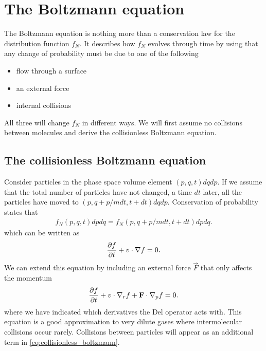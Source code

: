 \section{The Boltzmann equation}
The Boltzmann equation is nothing more than a conservation law for the distribution function $f_N$. It describes how $f_N$ evolves through time by using that any change of probability must be due to one of the following
\begin{itemize}
	\item flow through a surface
	\item an external force
	\item internal collisions
\end{itemize}
All three will change $f_N$ in different ways. We will first assume no collisions between molecules and derive the collisionless Boltzmann equation. 
\subsection{The collisionless Boltzmann equation}
Consider particles in the phase space volume element $(p,q, t)dqdp$. If we assume that the total number of particles have not changed, a time $dt$ later, all the particles have moved to $(p, q + p/m dt, t + dt)dqdp$. Conservation of probability states that
\begin{align}
	f_N(p, q, t) dpdq = f_N(p, q + p/mdt, t + dt)dpdq.
\end{align}
which can be written as
\begin{align}
	\frac{\partial f}{\partial t} + v\cdot\nabla f = 0.
\end{align}
We can extend this equation by including an external force $\vec F$ that only affects the momentum
\begin{align}
	\label{eq:collisionless_boltzmann}
	\frac{\partial f}{\partial t} + v\cdot\nabla_r f + \mathbf F\cdot \nabla_p f = 0.
\end{align}
where we have indicated which derivatives the Del operator acts with. This equation is a good approximation to very dilute gases where intermolecular collisions occur rarely. Collisions between particles will appear as an additional term in \eqref{eq:collisionless_boltzmann}.
